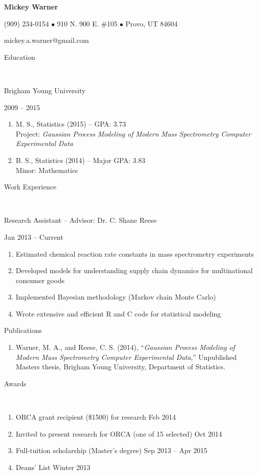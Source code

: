 \documentclass[12pt]{article}
\newcommand{\head}[1]{ %
    \bigskip %
    \bigskip %
    \begin{Large}\begin{bf}{#1}\end{bf}\end{Large} %

    \ \\ [-1.3cm] %

    \hrulefill}
\newcommand{\subhead}[1]{\begin{sc}{#1}\end{sc}}
\begin{document}

\centerline{ \Huge \bf Mickey Warner }
\smallskip
\centerline{ (909) 234-0154 $\bullet$ 910 N. 900 E. \#105 $\bullet$ Provo, UT 84604 }
\smallskip
\centerline{ mickey.a.warner@gmail.com }
\bigskip


\head{Education}

\subhead{Brigham Young University} \hfill 2009 -- 2015

\begin{enumerate}[label=$\cdot$, rightmargin=1.5cm]
\item M. S., Statistics (2015) -- GPA: 3.73 \\
Project: \emph{Gaussian Process Modeling of Modern Mass Spectrometry Computer Experimental Data}
\item B. S., Statistics (2014) -- Major GPA: 3.83 \\
Minor: Mathematics
\end{enumerate}

\head{Work Experience}

\subhead{Research Assistant -- Advisor: Dr. C. Shane Reese} \hfill Jan 2013 -- Current

\begin{enumerate}[label=$\cdot$, rightmargin=1.5cm]
\item Estimated chemical reaction rate constants in mass spectrometry experiments
\item Developed models for understanding supply chain dynamics for multinational consumer goods
\item Implemented Bayesian methodology (Markov chain Monte Carlo)
\item Wrote extensive and efficient R and C code for statistical modeling
\end{enumerate}

\subhead{Publications}

\begin{enumerate}[label=$\cdot$, rightmargin=1.5cm]
\item Warner, M. A., and Reese, C. S. (2014), ``\emph{Gaussian Process Modeling of Modern Mass Spectrometry Computer Experimental Data},'' Unpublished Masters thesis, Brigham Young University, Department of Statistics.
\end{enumerate}

\head{Awards}

\begin{enumerate}[label=$\cdot$]%
\item ORCA grant recipient (\$1500) for research \hfill Feb 2014
\item Invited to present research for ORCA (one of 15 selected) \hfill Oct 2014
\item Full-tuition scholarship (Master's degree) \hfill Sep 2013 -- Apr 2015
\item Deans' List \hfill Winter 2013
\end{enumerate}
\end{document}

